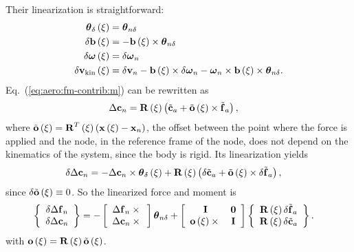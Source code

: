 Their linearization is straightforward:
\begin{subequations}
\begin{align}
	\T{\theta}_{\delta}\plbr{\xi}
	&=
	\T{\theta}_{n\delta}
	\\
	\delta\T{b}\plbr{\xi}
	&=
	- \T{b}\plbr{\xi}\times\T{\theta}_{n\delta}
	\\
	\delta\T{\omega}\plbr{\xi}
	&=
	\delta\T{\omega}_n
	\\
	\delta\T{v}_{\text{kin}}\plbr{\xi}
	&=
	\delta\T{v}_n
	- \T{b}\plbr{\xi}\times\delta\T{\omega}_n
	- \T{\omega}_n \times \T{b}\plbr{\xi} \times \T{\theta}_{n\delta}
	.
\end{align}
\end{subequations}
Eq.~(\ref{eq:aero:fm-contrib:m}) can be rewritten as
\begin{align}
	\Delta\T{c}_n
	&=
	\TT{R}\plbr{\xi}\plbr{
		\tilde{\T{c}}_a
		+ \tilde{\T{o}}\plbr{\xi} \times \tilde{\T{f}}_a
	} ,
\end{align}
where
$\tilde{\T{o}}\plbr{\xi}=\TT{R}^T\plbr{\xi}\plbr{\T{x}\plbr{\xi} - \T{x}_n}$,
the offset between the point where the force is applied and the node, 
in the reference frame of the node, does not depend on the kinematics
of the system, since the body is rigid.
Its linearization yields
\begin{align}
	\delta\Delta\T{c}_n
	&=
	- \Delta\T{c}_n \times \T{\theta}_{\delta}\plbr{\xi}
	+ \TT{R}\plbr{\xi} \plbr{
		\delta\tilde{\T{c}}_a
		+ \tilde{\T{o}}\plbr{\xi} \times \delta\tilde{\T{f}}_a
	}
	,
\end{align}
since $\delta\tilde{\T{o}}\plbr{\xi}\equiv{0}$.
So the linearized force and moment is
\begin{align}
	\cubr{\cvvect{
		\delta\Delta\T{f}_n \\
		\delta\Delta\T{c}_n
	}}
	&=
	- \sqbr{\cvvect{
		\Delta\T{f}_n \times{} \\
		\Delta\T{c}_n \times{}
	}} \T{\theta}_{n\delta}
	+ \sqbr{\matr{cc}{
		\TT{I} & \TT{0} \\
		\T{o}\plbr{\xi}\times{} & \TT{I}
	}} \cubr{\cvvect{
		\TT{R}\plbr{\xi} \delta\tilde{\T{f}}_a \\
		\TT{R}\plbr{\xi} \delta\tilde{\T{c}}_a
	}}
	.
\end{align}
with $\T{o}\plbr{\xi}=\TT{R}\plbr{\xi} \tilde{\T{o}}\plbr{\xi}$.

